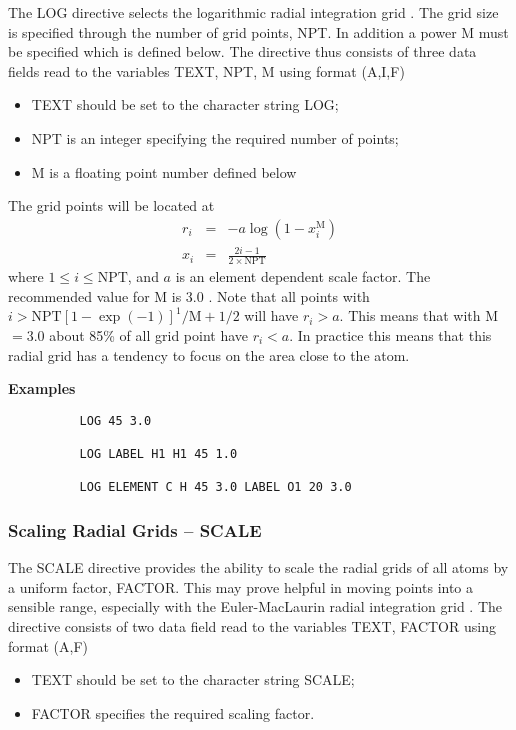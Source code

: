 \documentclass[11pt,fleqn]{article}
\begin{document}
The LOG directive selects the logarithmic radial integration grid \cite{mura96}.
The grid size is specified through the number of grid points, NPT. In addition 
a power M must be specified which is defined below. The directive thus consists 
of three data fields read to the variables TEXT, NPT, M using format (A,I,F)

\begin{itemize}
\item TEXT should be set to the character string LOG;
\item NPT is an integer specifying the required number of points;
\item M is a floating point number defined below
\end{itemize}

The grid points will be located at
\begin{eqnarray*}
   r_i &=& -a \log(1-x_i^{\mathrm{M}}) \\
   x_i &=& \frac{2i-1}{2\times\mathrm{NPT}} 
\end{eqnarray*}
where $ 1\leq i \leq \mathrm{NPT}$,
and $a$ is an element dependent scale factor. The recommended value for M is
3.0 \cite{mura96}.
Note that all points 
with $i > \mathrm{NPT}[1-\exp(-1)]^1/\mathrm{M}+1/2$ will have $r_i > a$.  
This means that with M $= 3.0$ about 85\% of all grid point have $r_i < a$.
In practice this means that this radial grid has a tendency to focus on the 
area close to the atom.

{\bf Examples}

{
\footnotesize
\begin{verbatim}
          LOG 45 3.0

          LOG LABEL H1 H1 45 1.0

          LOG ELEMENT C H 45 3.0 LABEL O1 20 3.0
\end{verbatim}
}


\subsubsection{Scaling Radial Grids -- SCALE}

The SCALE directive provides the ability to scale the radial
grids of all atoms by a uniform factor, FACTOR. This may 
prove helpful in moving points into a sensible range, especially with the 
Euler-MacLaurin radial integration grid \cite{murray93}. The 
directive consists of two data field read to the variables TEXT, FACTOR
using format (A,F)
\begin{itemize}
\item TEXT should be set to the character string SCALE;
\item FACTOR specifies the required scaling factor.
\end{itemize}
\end{document}
